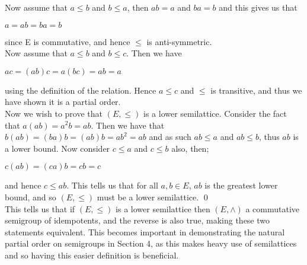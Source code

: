 \documentclass[12pt]{article}
\begin{document}
	 Now assume that $a \leq b$ and $b \leq a$, then $ab = a$ and $ba = b$ and this gives us that
	\begin{center}
		$a = ab = ba = b$
	\end{center}
	since E is commutative, and hence $\leq$ is anti-symmetric.\\
	Now assume that $a \leq b$ and $b \leq c$. Then we have
	\begin{center}
		$ac = (ab)c=a(bc)=ab=a$
	\end{center}
	using the definition of the relation. Hence $a\leq c$ and $\leq$ is transitive, and thus we have shown it is a partial order.\\
	Now we wish to prove that $(E, \leq)$ is a lower semilattice. Consider the fact that $a(ab)=a^2 b =ab$. Then we have that $b(ab)=(ba)b=(ab)b=ab^2=ab$ and as such $ab \leq a$ and $ab \leq b$, thus $ab$ is a lower bound. Now consider $c \leq a$ and $c \leq b$ also, then;
	\begin{center}
		$c(ab)=(ca)b=cb=c$
	\end{center}
	and hence $c\leq ab$. This tells us that for all $a,b \in E$, $ab$ is the greatest lower bound, and so $(E,\leq)$ must be a lower semilattice.
	\qed
\\This tells us that if $(E,\leq)$ is a lower semilattice then $(E,\wedge)$ a commutative semigroup of idempotents, and the reverse is also true, making these two statements equivalent. This becomes important in demonstrating the natural partial order on semigroups in Section 4, as this makes heavy use of semilattices and so having this easier definition is beneficial.
\end{document}
